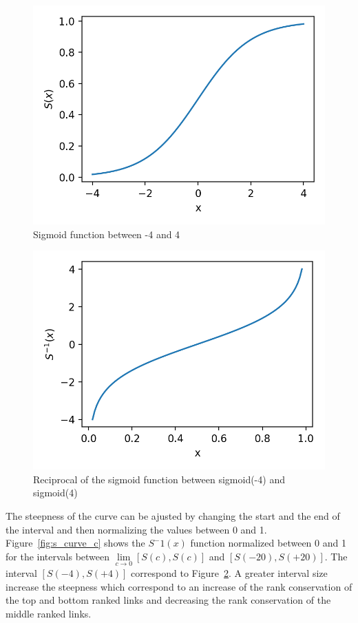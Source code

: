 \begin{figure}
  \includegraphics[width=\linewidth]{img/sigmoid.png}
  \caption{Sigmoid function between -4 and 4}
  \label{fig:sigmoid}
\end{figure}
\begin{figure}
  \includegraphics[width=\linewidth]{img/sigmoid_r.png}
  \caption{Reciprocal of the sigmoid function between sigmoid(-4) and sigmoid(4)}
  \label{fig:sigmoid_r}
\end{figure}

The steepness of the curve can be ajusted by changing the start and the end of the interval and then normalizing the values between 0 and 1.
Figure~\ref{fig:s_curve_c} shows the $S^-1(x)$ function normalized between 0 and 1 for the intervals between $\lim\limits_{c \rightarrow 0} \left[S(c), S(c)\right]$ and $\left[S(-20), S(+20)\right]$.
The interval $\left[S(-4), S(+4)\right]$ correspond to Figure~\ref{fig:sigmoid_r}.
A greater interval size increase the steepness which correspond to an increase of the rank conservation of the top and bottom ranked links and decreasing the rank conservation of the middle ranked links.

